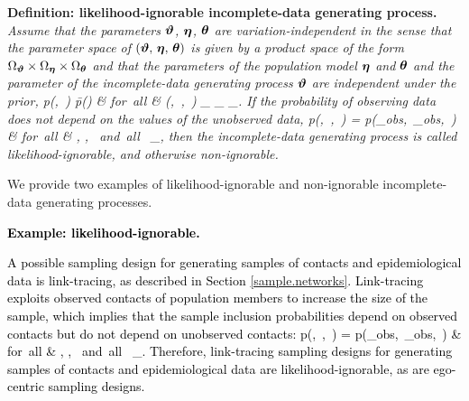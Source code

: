 \documentclass[12pt,usenatbib,referee]{article}
\renewcommand{\alert}{\textcolor{black}}
\begin{document}
{\bf Definition: likelihood-ignorable incomplete-data generating process.}
{\em 
Assume that the parameters $\boldsymbol{\vartheta}$, $\boldsymbol{\eta}$, $\boldsymbol{\theta}$ are variation-independent in the sense that the parameter space of $(\boldsymbol{\vartheta},\, \boldsymbol{\eta},\, \boldsymbol{\theta})$ is given by a product space of the form $\Omega_{\boldsymbol{\vartheta}} \times \Omega_{\boldsymbol{\eta}} \times \Omega_{\boldsymbol{\theta}}$ and that the parameters of the population model $\boldsymbol{\eta}$ and $\boldsymbol{\theta}$ and the parameter of the incomplete-data generating process $\boldsymbol{\vartheta}$ are independent under the prior,
\bea
\label{joint.prior}
p(\bvartheta \mid \bta,\, \btheta) 
\= p(\bvartheta) & \mbox{for all} & (\bvartheta,\, \bta,\, \btheta) \in \Omega_{\bvartheta} \times \Omega_{\bta} \times \Omega_{\btheta}.
\eea
If the probability of observing data does not depend on the values of the unobserved data,
\bea
\label{conditional.u}
p(\baa \mid \bx,\, \by,\, \bvartheta)
\;=\; p(\baa \mid \bx_{\mbox{\tiny obs}},\, \by_{\mbox{\tiny obs}},\, \bvartheta) & \mbox{for all} & \baa,\; \bx,\; \by \mbox{ and all } \bvartheta \in \Omega_{\bvartheta},
\eea
then the incomplete-data generating process is called likelihood-ignorable, 
and otherwise non-ignorable.
}

\vspace{-.35cm}

We provide two examples of likelihood-ignorable and non-ignorable incomplete-data generating processes.\s

\alert{{\bf Example: likelihood-ignorable.}}
\alert{}\s

\alert{A possible sampling design for generating samples of contacts and epidemiological data is link-tracing,
as described in Section \ref{sample.networks}.
Link-tracing exploits observed contacts of population members to increase the size of the sample,
which implies that the sample inclusion probabilities depend on observed contacts but do not depend on unobserved contacts:
\bea
p(\baa \mid \bx,\, \by,\, \bvartheta)
\;=\; p(\baa \mid \bx_{\mbox{\tiny obs}},\, \by_{\mbox{\tiny obs}},\, \bvartheta) & \mbox{for all} & \baa,\; \bx,\; \by \mbox{ and all } \bvartheta \in \Omega_{\bvartheta}.
\eea
Therefore,
link-tracing sampling designs for generating samples of contacts and epidemiological data are likelihood-ignorable,
as are ego-centric sampling designs.}
\vspace{.25cm}
\end{document}
